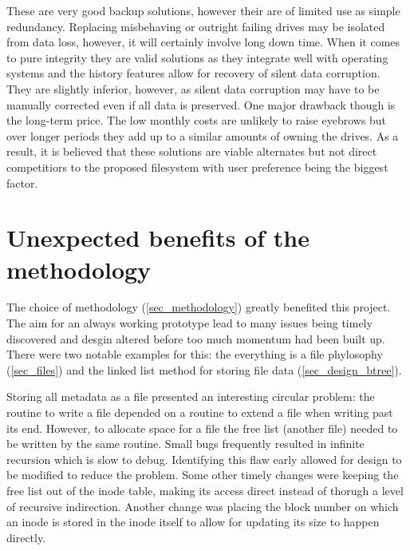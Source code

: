         These are very good backup solutions, however their are of limited use
        as simple redundancy. Replacing misbehaving or outright failing drives
        may be isolated from data loss, however, it will certainly involve long
        down time. When it comes to pure integrity they are valid solutions as
        they integrate well with operating systems and the history features
        allow for recovery of silent data corruption. They are slightly
        inferior, however, as silent data corruption may have to be manually
        corrected even if all data is preserved. One major drawback though is
        the long-term price. The low monthly costs are unlikely to raise
        eyebrows but over longer periods they add up to a similar amounts of
        owning the drives. As a result, it is believed that these solutions are
        viable alternates but not direct competitiors to the proposed
        filesystem with user preference being the biggest factor.


    \section{Unexpected benefits of the methodology}

        The choice of methodology (\ref{sec_methodology}) greatly benefited
        this project. The aim for an always working prototype lead to many
        issues being timely discovered and desgin altered before too much
        momentum had been built up. There were two notable examples for this:
        the everything is a file phylosophy (\ref{sec_files}) and the linked
        list method for storing file data (\ref{sec_design_btree}).

        Storing all metadata as a file presented an interesting circular
        problem: the routine to write a file depended on a routine to extend a
        file when writing past its end. However, to allocate space for a file
        the free list (another file) needed to be written by the same routine.
        Small bugs frequently resulted in infinite recursion which is slow to
        debug. Identifying this flaw early allowed for design to be modified to
        reduce the problem. Some other timely changes were keeping the free
        list out of the inode table, making its access direct instead of
        thorugh a level of recursive indirection. Another change was placing
        the block number on which an inode is stored in the inode itself to
        allow for updating its size to happen directly.

